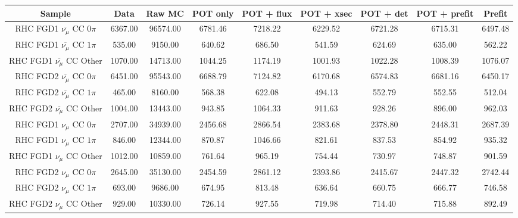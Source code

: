 \documentclass{article}
\begin{document}
\begin{centering}
\begin{tabular}{ccccccccc}
\toprule
Sample & Data & Raw MC & POT only & POT + flux & POT + xsec & POT + det & POT + prefit & Prefit \\ \midrule
RHC FGD1 $\overbar{\nu_{\mu}}$ CC $0\pi$   &  6367.00  &  96574.00  &  6781.46  &  7218.22 &  6229.52 &  6721.28    &  6715.31  &  6497.48\\
RHC FGD1 $\overbar{\nu_{\mu}}$ CC $1\pi$   &  535.00   &  9150.00   &  640.62   &  686.50 &  541.59 &  624.69       &  635.00   &  562.22\\
RHC FGD1 $\overbar{\nu_{\mu}}$ CC Other    &  1070.00  &  14713.00  &  1044.25  &  1174.19 &  1001.93 &  1022.28    &  1008.39  &  1076.07\\
  
RHC FGD2 $\overbar{\nu_{\mu}}$ CC $0\pi$   &  6451.00  &  95543.00  &  6688.79  &  7124.82 &  6170.68 &  6574.83    &  6681.16  &  6450.17\\
RHC FGD2 $\overbar{\nu_{\mu}}$ CC $1\pi$   &  465.00   &  8160.00   &  568.38 &  622.08 &  494.13 &  552.79         &  552.55   &  512.04\\
RHC FGD2 $\overbar{\nu_{\mu}}$ CC Other    &  1004.00  &  13443.00 &  943.85 &  1064.33 &  911.63 &  928.26         &  896.00   &  962.03\\

RHC FGD1 $\nu_{\mu}$ CC $0\pi$ &  2707.00  &  34939.00 &  2456.68 &  2866.54 &  2383.68 &  2378.80                  &  2448.31  &  2687.39\\
RHC FGD1 $\nu_{\mu}$ CC $1\pi$ &  846.00   &  12344.00 &  870.87 &  1046.66 &  821.61 &  837.53                     &  854.92   &  935.32\\
RHC FGD1 $\nu_{\mu}$ CC Other &  1012.00   &  10859.00 &  761.64 &  965.19 &  754.44 &  730.97                      &  748.87   &  901.59\\

RHC FGD2 $\nu_{\mu}$ CC $0\pi$ &  2645.00 &  35130.00 &  2454.59 &  2861.12 &  2393.86 &  2415.67                   &  2447.32  &  2742.44\\
RHC FGD2 $\nu_{\mu}$ CC $1\pi$ &  693.00 &  9686.00 &  674.95 &  813.48 &  636.64 &  660.75                         &  666.77   &  746.58\\
RHC FGD2 $\nu_{\mu}$ CC Other &  929.00 &  10330.00 &  726.14 &  927.55 &  719.98 &  714.40                         &  715.88   &  892.49\\


\end{tabular}
\end{centering}
\end{document}

